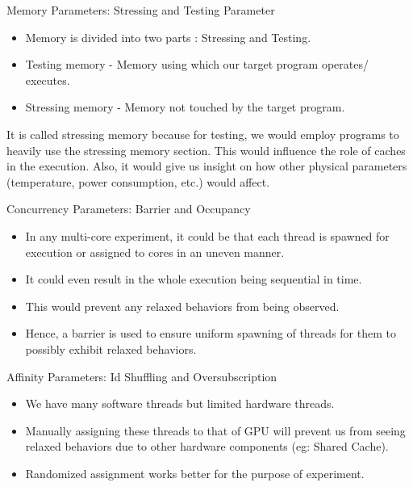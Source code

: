 \documentclass{beamer}
\begin{document}
    \begin{frame}{Memory Parameters: Stressing and Testing Parameter}

        \begin{itemize}
            \item Memory is divided into two parts : Stressing and Testing.
            \item Testing memory - Memory using which our target program operates/ executes.
            \item Stressing memory - Memory not touched by the target program.
        \end{itemize}
        
        It is called stressing memory because for testing, we would employ programs to heavily use the stressing memory section.
        This would influence the role of caches in the execution. 
        Also, it would give us insight on how other physical parameters (temperature, power consumption, etc.) would affect.

    \end{frame}

    \begin{frame}{Concurrency Parameters: Barrier and Occupancy}

        \begin{itemize}
            \item In any multi-core experiment, it could be that each thread is spawned for execution or assigned to cores in an uneven manner.
            \item It could even result in the whole execution being sequential in time. 
            \item This would prevent any relaxed behaviors from being observed. 
            \item Hence, a barrier is used to ensure uniform spawning of threads for them to possibly exhibit relaxed behaviors.
        \end{itemize}
        


    \end{frame}

    \begin{frame}{Affinity Parameters: Id Shuffling and Oversubscription}

        \begin{itemize}
            \item We have many software threads but limited hardware threads.
            \item Manually assigning these threads to that of GPU will prevent us from seeing relaxed behaviors due to other hardware components (eg: Shared Cache).
            \item Randomized assignment works better for the purpose of experiment.
        \end{itemize}
        
    \end{frame}
\end{document}
